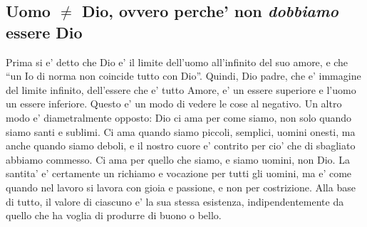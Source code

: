 
\subsection{Uomo $\ne$ Dio, ovvero perche' non \emph{dobbiamo} essere Dio}
Prima si e' detto che Dio e' il limite dell'uomo all'infinito del suo amore, e che ``un Io di norma non coincide tutto con Dio''.
Quindi, Dio padre, che e' immagine del limite infinito, dell'essere che e' tutto Amore, e' un essere superiore e l'uomo un essere inferiore.
Questo e' un modo di vedere le cose al negativo. Un altro modo e' diametralmente opposto: Dio ci ama per come siamo, non solo quando siamo santi e sublimi. Ci ama quando siamo piccoli, semplici, uomini onesti, ma anche quando siamo deboli, e il nostro cuore e' contrito per cio' che di sbagliato abbiamo commesso. Ci ama per quello che siamo, e siamo uomini, non Dio. La santita' e' certamente un richiamo e vocazione per tutti gli uomini, ma e' come quando nel lavoro si lavora con gioia e passione, e non per costrizione. Alla base di tutto, il valore di ciascuno e' la sua stessa esistenza, indipendentemente da quello che ha voglia di produrre di buono o bello.

